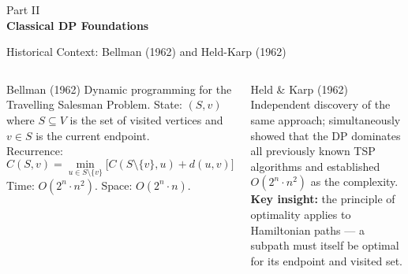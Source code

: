 \documentclass[aspectratio=169,t]{beamer}
\begin{document}
{
\begin{frame}[plain]
  \vspace{2cm}
  \begin{center}
    {\color{lightblue}\small Part II}\\[0.4cm]
    {\color{white}\LARGE\bfseries Classical DP Foundations}
  \end{center}
\end{frame}
}

\begin{frame}{Historical Context: Bellman (1962) and Held-Karp (1962)}
\small
\begin{columns}[t]
\begin{block}{Bellman (1962)}
  Dynamic programming for the Travelling Salesman Problem.
  State: $(S, v)$ where $S \subseteq V$ is the set of visited
  vertices and $v \in S$ is the current endpoint.\\[4pt]
  Recurrence:
  \[ C(S, v) = \min_{u \in S \setminus \{v\}} \bigl[C(S\setminus\{v\}, u) + d(u,v)\bigr] \]
  Time: $O(2^n \cdot n^2)$.  Space: $O(2^n \cdot n)$.
\end{block}

\begin{block}{Held \& Karp (1962)}
  Independent discovery of the same approach; simultaneously
  showed that the DP dominates all previously known TSP algorithms
  and established $O(2^n \cdot n^2)$ as the complexity.\\[4pt]
  \textbf{Key insight:} the principle of optimality applies to
  Hamiltonian paths — a subpath must itself be optimal for its
  endpoint and visited set.
\end{block}
\end{columns}

\vspace{0.15cm}
\begin{center}
\end{center}
\end{frame}
\end{document}

